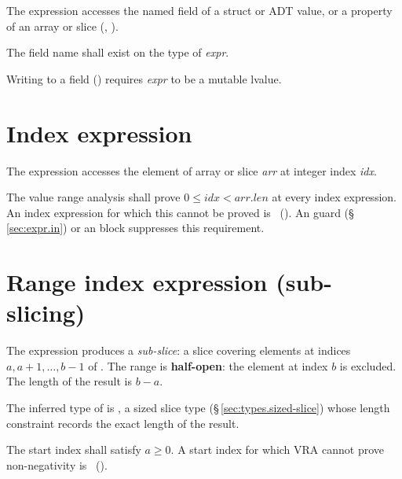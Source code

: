 \pnum
The expression  accesses the named field of a struct or
ADT value, or a property of an array or slice (, ).

\begin{constraint}
  The field name shall exist on the type of \textit{expr}.
\end{constraint}

\begin{constraint}
  Writing to a field () requires \textit{expr} to be
  a mutable lvalue.
\end{constraint}

\section{Index expression}
\label{sec:expr.index}

\pnum
The expression  accesses the element of array or slice
\textit{arr} at integer index \textit{idx}.

\begin{constraint}
  The value range analysis shall prove $0 \leq \mathit{idx} < \mathit{arr.len}$
  at every index expression.  An index expression for which this cannot be
  proved is \illformed{}~().  An  guard
  (\S\,\ref{sec:expr.in}) or an  block suppresses this
  requirement.
\end{constraint}

\section{Range index expression (sub-slicing)}
\label{sec:expr.subslice}

\pnum
The expression  produces a \textit{sub-slice}: a slice
covering elements at indices $a, a+1, \ldots, b-1$ of .  The
range is \textbf{half-open}: the element at index $b$ is excluded.  The
length of the result is $b - a$.

\pnum
The inferred type of  is , a sized slice
type (\S\,\ref{sec:types.sized-slice}) whose length constraint records
the exact length of the result.

\begin{constraint}
  The start index  shall satisfy $a \geq 0$.  A start index for
  which VRA cannot prove non-negativity is \illformed{}~().
\end{constraint}

